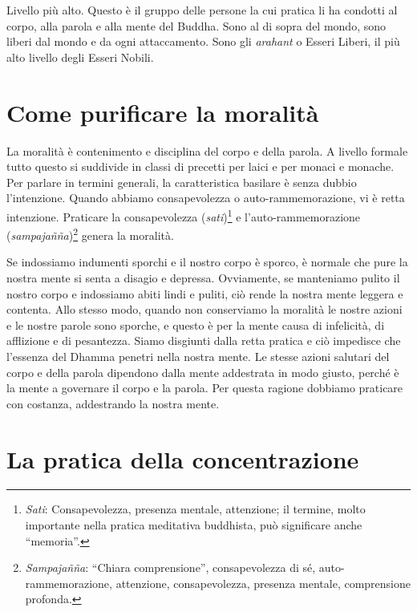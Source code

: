 Livello più alto. Questo è il gruppo delle persone la cui pratica li ha
condotti al corpo, alla parola e alla mente del Buddha. Sono al di sopra
del mondo, sono liberi dal mondo e da ogni attaccamento. Sono gli
\emph{arahant} o Esseri Liberi, il più alto livello degli Esseri Nobili.

\section{Come purificare la moralità}

La moralità è contenimento e disciplina del corpo e della parola. A
livello formale tutto questo si suddivide in classi di precetti per
laici e per monaci e monache. Per parlare in termini generali, la
caratteristica basilare è senza dubbio l'intenzione. Quando abbiamo
consapevolezza o auto-rammemorazione, vi è retta intenzione. Praticare
la consapevolezza (\emph{sati})\footnote{\emph{Sati}: Consapevolezza,
  presenza mentale, attenzione; il termine, molto importante nella
  pratica meditativa buddhista, può significare anche ``memoria''.} e
l'auto-rammemorazione (\emph{sampajañña})\footnote{\emph{Sampajañña}:
  ``Chiara comprensione'', consapevolezza di sé, auto-rammemorazione,
  attenzione, consapevolezza, presenza mentale, comprensione profonda.}
genera la moralità.

Se indossiamo indumenti sporchi e il nostro corpo è sporco, è normale
che pure la nostra mente si senta a disagio e depressa. Ovviamente, se
manteniamo pulito il nostro corpo e indossiamo abiti lindi e puliti, ciò
rende la nostra mente leggera e contenta. Allo stesso modo, quando non
conserviamo la moralità le nostre azioni e le nostre parole sono
sporche, e questo è per la mente causa di infelicità, di afflizione e di
pesantezza. Siamo disgiunti dalla retta pratica e ciò impedisce che
l'essenza del Dhamma penetri nella nostra mente. Le stesse azioni
salutari del corpo e della parola dipendono dalla mente addestrata in
modo giusto, perché è la mente a governare il corpo e la parola. Per
questa ragione dobbiamo praticare con costanza, addestrando la nostra
mente.

\section{La pratica della concentrazione}

